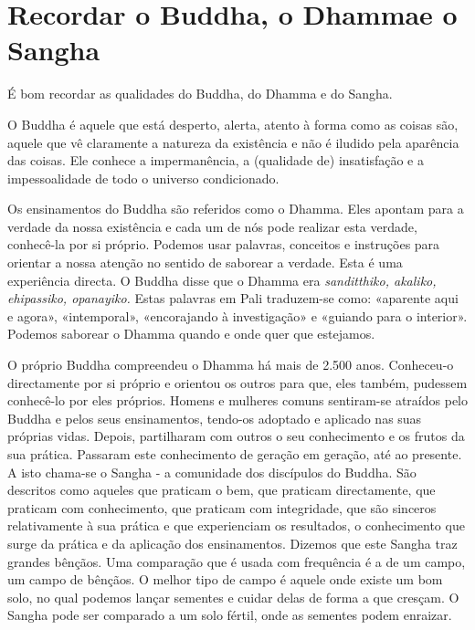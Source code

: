 \chapter[Recordar o Buddha, o Dhamma e o Sangha]{Recordar o Buddha, o Dhamma\newline e o Sangha}

É bom recordar as qualidades do Buddha, do Dhamma e do Sangha.

O Buddha é aquele que está desperto, alerta, atento à forma como as
coisas são, aquele que vê claramente a natureza da existência e não é
iludido pela aparência das coisas. Ele conhece a impermanência, a
(qualidade de) insatisfação e a impessoalidade de todo o universo
condicionado.

Os ensinamentos do Buddha são referidos como o Dhamma. Eles apontam para
a verdade da nossa existência e cada um de nós pode realizar esta
verdade, conhecê-la por si próprio. Podemos usar palavras, conceitos e
instruções para orientar a nossa atenção no sentido de saborear a
verdade. Esta é uma experiência directa. O Buddha disse que o Dhamma era
\emph{sanditthiko, akaliko, ehipassiko, opanayiko.} Estas palavras em
Pali traduzem-se como: «aparente aqui e agora», «intemporal»,
«encorajando à investigação» e «guiando para o interior». Podemos
saborear o Dhamma quando e onde quer que estejamos.

O próprio Buddha compreendeu o Dhamma há mais de 2.500 anos. Conheceu-o
directamente por si próprio e orientou os outros para que, eles também,
pudessem conhecê-lo por eles próprios. Homens e mulheres comuns
sentiram-se atraídos pelo Buddha e pelos seus ensinamentos, tendo-os
adoptado e aplicado nas suas próprias vidas. Depois, partilharam com
outros o seu conhecimento e os frutos da sua prática. Passaram este
conhecimento de geração em geração, até ao presente. A isto chama-se o
Sangha - a comunidade dos discípulos do Buddha. São descritos como
aqueles que praticam o bem, que praticam directamente, que praticam com
conhecimento, que praticam com integridade, que são sinceros
relativamente à sua prática e que experienciam os resultados, o
conhecimento que surge da prática e da aplicação dos ensinamentos.
Dizemos que este Sangha traz grandes bênçãos. Uma comparação que é usada
com frequência é a de um campo, um campo de bênçãos. O melhor tipo de
campo é aquele onde existe um bom solo, no qual podemos lançar sementes
e cuidar delas de forma a que cresçam. O Sangha pode ser comparado a um
solo fértil, onde as sementes podem enraizar.

